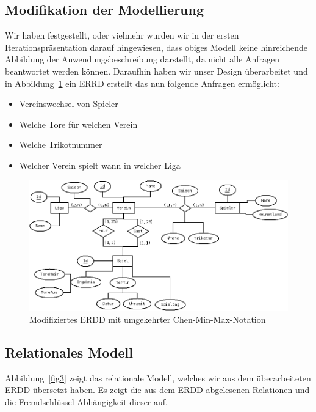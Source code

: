 \documentclass[
10pt,
a4paper
]{scrartcl}
\begin{document}
\subsection{Modifikation der Modellierung}

Wir haben festgestellt, oder vielmehr wurden wir in der ersten Iterationspräsentation darauf hingewiesen, dass obiges Modell keine hinreichende Abbildung der Anwendungsbeschreibung darstellt, da nicht alle Anfragen beantwortet werden können. Daraufhin haben wir unser Design überarbeitet und in Abbildung~\ref{fig2} ein ERRD erstellt das nun folgende Anfragen ermöglicht:

 \begin{itemize}
  \item Vereinswechsel von Spieler
  \item Welche Tore für welchen Verein
  \item Welche Trikotnummer
  \item Welcher Verein spielt wann in welcher Liga
\end{itemize}

\begin{figure}[h]
	\centering
  \includegraphics[scale=0.4]{bundesliga.png}
	\caption{Modifiziertes ERDD mit umgekehrter Chen-Min-Max-Notation}
	\label{fig2}
\end{figure}

\subsection{Relationales Modell }

Abbildung~\ref{fig3} zeigt das relationale Modell, welches wir aus dem überarbeiteten ERDD übersetzt haben. Es zeigt die aus dem ERDD abgelesenen Relationen und die Fremdschlüssel  Abhängigkeit dieser auf.
\end{document}
